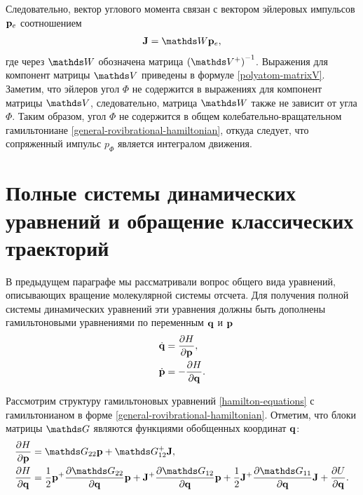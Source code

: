 Следовательно, вектор углового момента связан с вектором эйлеровых импульсов $\mathbf{p}_e$ соотношением
\begin{gather}
    \mf{J} = \bbW \pe, \label{polyatom-angular-momentum-euler-momenta}
\end{gather}
%
где через $\bbW$ обозначена матрица $\lb \bbV^{+} \rb^{-1}$. Выражения для компонент матрицы $\bbV$ приведены в формуле \eqref{polyatom-matrixV}. Заметим, что эйлеров угол $\Phi$ не содержится в выражениях для компонент матрицы $\bbV$, следовательно, матрица $\bbW$ также не зависит от угла $\Phi$. Таким образом, угол $\Phi$ не содержится в общем колебательно-вращательном гамильтониане \eqref{general-rovibrational-hamiltonian}, откуда следует, что сопряженный импульс $p_\Phi$ является интегралом движения. \par

\section{Полные системы динамических уравнений и обращение классических траекторий}

В предыдущем параграфе мы рассматривали вопрос общего вида уравнений, описывающих вращение молекулярной системы отсчета. Для получения полной системы динамических уравнений эти уравнения должны быть дополнены гамильтоновыми уравнениями по переменным $\mathbf{q}$ и $\mathbf{p}$
\begin{gather}
    \begin{aligned}
        \dot{\mathbf{q}} &= \frac{\partial H}{\partial \mathbf{p}}, \\
        \dot{\mathbf{p}} &= -\frac{\partial H}{\partial \mathbf{q}}.
    \end{aligned} \label{hamilton-equations}
\end{gather}

Рассмотрим структуру гамильтоновых уравнений \eqref{hamilton-equations} с гамильтонианом в форме \eqref{general-rovibrational-hamiltonian}. Отметим, что блоки матрицы $\bbG$ являются функциями обобщенных координат $\mathbf{q}$:
\begin{gather}
    \begin{aligned}
        \frac{\partial H}{\partial \mf{p}} &= \bbG_{22} \mf{p} + \bbG_{12}^{+} \mf{J}, \\
        \frac{\partial H}{\partial \mf{q}} &= \frac{1}{2} \mf{p}^+ \frac{\partial \bbG_{22}}{\partial \mf{q}} \mf{p} + \mf{J}^+ \frac{\partial \bbG_{12}}{\partial \mf{q}} \mf{p} + \frac{1}{2} \mf{J}^+ \frac{\partial \bbG_{11}}{\partial \mf{q}} \mf{J} + \frac{\partial U}{\partial \mf{q}}.
    \end{aligned} \label{hamilton-equations1}
\end{gather}


